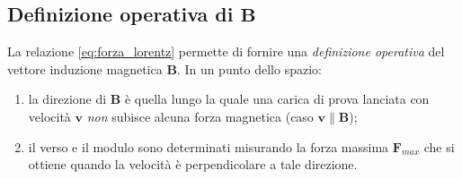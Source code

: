 \documentclass[a4paper,11pt]{report}
\begin{document}
    \subsection{Definizione operativa di \texorpdfstring{$\bm{B}$}{B}}
La relazione \eqref{eq:forza_lorentz} permette di fornire una \textit{definizione operativa} del vettore induzione magnetica $\bm{B}$. In un punto dello spazio:
\begin{enumerate}
    \item la direzione di $\bm{B}$ è quella lungo la quale una carica di prova lanciata con velocità $\bm{v}$ \textit{non} subisce alcuna forza magnetica (caso $\bm{v} \parallel \bm{B}$);
    \item il verso e il modulo sono determinati misurando la forza massima $\bm{F}_{max}$ che si ottiene quando la velocità è perpendicolare a tale direzione.
\end{enumerate}
\end{document}

